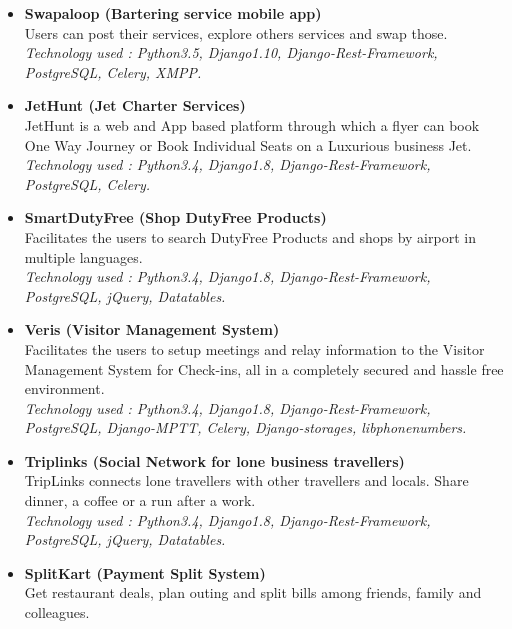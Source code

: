 \documentclass[11pt]{article}
\begin{document}
\begin{itemize}
 \item \textbf{Swapaloop (Bartering service mobile app)}
    \\ Users can post their services, explore others services and swap those.
    \\ \textit{Technology used : Python3.5, Django1.10, Django-Rest-Framework, PostgreSQL, Celery, XMPP.}
 \item \textbf{JetHunt (Jet Charter Services)}
    \\ JetHunt is a web and App based platform through which a flyer can book One Way Journey or Book Individual Seats on a Luxurious business Jet.
    \\ \textit{Technology used : Python3.4, Django1.8, Django-Rest-Framework, PostgreSQL, Celery.}
 \item \textbf{SmartDutyFree (Shop DutyFree Products)}
    \\ Facilitates the users to search DutyFree Products and shops by airport in multiple languages.
    \\ \textit{Technology used : Python3.4, Django1.8, Django-Rest-Framework, PostgreSQL, jQuery, Datatables.}
 \item \textbf{Veris (Visitor Management System)}
    \\ Facilitates the users to setup meetings and relay information to the Visitor Management System for Check-ins, all in a completely secured and hassle free environment.
    \\ \textit{Technology used : Python3.4, Django1.8, Django-Rest-Framework, PostgreSQL, Django-MPTT, Celery, Django-storages, libphonenumbers.}
 \item \textbf{Triplinks (Social Network for lone business travellers)}
    \\ TripLinks connects lone travellers with other travellers and locals. Share dinner, a coffee or a run after a work.
    \\ \textit{Technology used : Python3.4, Django1.8, Django-Rest-Framework, PostgreSQL, jQuery, Datatables.}
 \item \textbf{SplitKart (Payment Split System)}
    \\ Get restaurant deals, plan outing and split bills among friends, family and colleagues.

\end{itemize}
\end{document}
